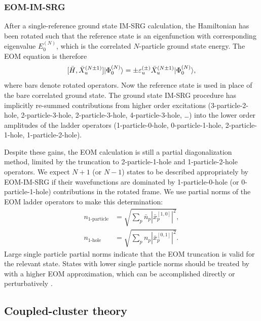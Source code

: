 \subsubsection*{EOM-IM-SRG}
After a single-reference ground state IM-SRG calculation, the Hamiltonian has been rotated such that the reference state is an eigenfunction with corresponding eigenvalue $E^{(N)}_0$, which is the correlated $N$-particle ground state energy. The EOM equation is therefore
\begin{equation}\label{eq:EOMIMSRG}
  [\bar{H},\bar{X}^{(N \pm 1)}_u] | \Phi^{(N)}_0 \rangle = \pm \varepsilon^{(\pm)}_u \bar{X}^{(N \pm 1)}_u | \Phi^{(N)}_0 \rangle,
\end{equation}
where bars denote rotated operators. Now the reference state is used in place of the bare correlated ground state. The ground state IM-SRG procedure has implicitly re-summed contributions from higher order excitations (3-particle-2-hole, 2-particle-3-hole, 2-particle-3-hole, 4-particle-3-hole, \ldots) into the lower order amplitudes of the ladder operators (1-particle-0-hole, 0-particle-1-hole, 2-particle-1-hole, 1-particle-2-hole).

Despite these gains, the EOM calculation is still a partial diagonalization method, limited by the truncation to 2-particle-1-hole and 1-particle-2-hole operators. We expect $N + 1$ (or $N - 1$) states to be described appropriately by EOM-IM-SRG if their wavefunctions are dominated by 1-particle-0-hole (or 0-particle-1-hole) contributions in the rotated frame. We use partial norms of the EOM ladder operators to make this determination:
\begin{align}
  \label{eq:partial_norms_p}
  n_{\text{1-particle}} &= \sqrt{\sum_p \bar{n}_p | \bar{x}^{[1,0]}_p |^2},\\
  \label{eq:partial_norms_h}
  n_{\text{1-hole}} &= \sqrt{\sum_p n_p | \bar{x}^{[0,1]}_p |^2}.
\end{align}
Large single particle partial norms indicate that the EOM truncation is valid for the relevant state. States with lower single particle norms should be treated by with a higher EOM approximation, which can be accomplished directly or perturbatively \cite{PhysRevC.95.044304}.

\subsection{Coupled-cluster theory}
\label{subsec:cctheory}

